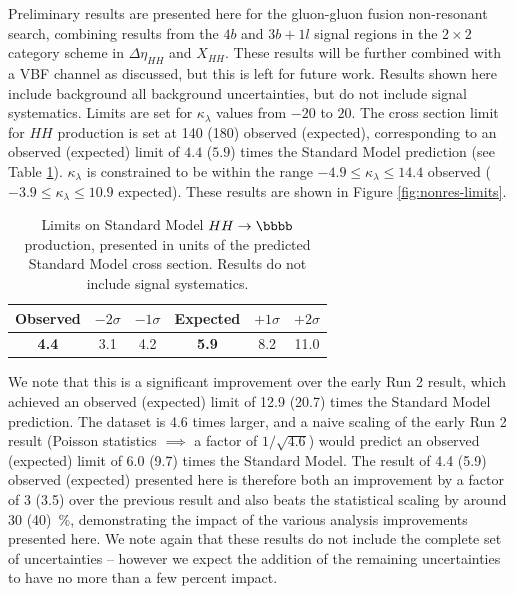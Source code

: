 Preliminary results are presented here for the gluon-gluon fusion non-resonant search, combining results from the $4b$ 
and $3b+1l$ signal regions in the $2\times 2$ category scheme in $\Delta \eta_{HH}$ and $X_{HH}$. These results will be 
further combined with a VBF channel as discussed, but this is left for future work. Results shown here include 
background all background uncertainties, but do not include signal systematics. Limits are set for $\kappa_{\lambda}$ 
values from $-20$ to $20$. 
The cross section limit for $HH$ production is set at \SI{140}{\fb} (\SI{180}{\fb}) observed (expected), 
corresponding to an observed (expected) limit of $4.4$ ($5.9$) times the Standard Model prediction 
(see Table \ref{tbl:SM-HH-limits}). 
$\kappa_{\lambda}$ is constrained to be within the range $-4.9 \leq \kappa_{\lambda} \leq 14.4$ observed 
($-3.9 \leq \kappa_{\lambda} \leq 10.9$ expected). These results are shown in Figure \ref{fig:nonres-limits}.

\begin{table}
\centering
\begin{tabular}{ |c|c|c|c|c|c| } 
\hline
\textbf{Observed} & $-2\sigma$ & $-1\sigma$ & \textbf{Expected} & $+1\sigma$ & $+2\sigma$\\
 \hline
\textbf{4.4}	& 3.1	& 4.2 & \textbf{5.9}	& 8.2 & 11.0\\
 \hline
\end{tabular}
 \caption{\label{tbl:SM-HH-limits} Limits on Standard Model $HH\rightarrow \bbbb$ production, presented in units of the 
predicted Standard Model cross section. Results do not include signal systematics.}
\end{table}

We note that this is a significant improvement over the early Run 2 result, which achieved an observed (expected) 
limit of 12.9 (20.7) times the Standard Model prediction. The dataset is 4.6 times larger, and a naive scaling 
of the early Run 2 result (Poisson statistics $\implies$ a factor of $1/\sqrt{4.6}$) would predict an observed (expected)
limit of 6.0 (9.7) times the Standard Model. The result of 4.4 (5.9) observed (expected) presented here is 
therefore both an improvement by a factor of 3 (3.5) over the previous result and also beats the statistical 
scaling by around 30 (40)~\%, demonstrating the impact of the various analysis improvements presented here. We 
note again that these results do not include the complete set of uncertainties -- however we expect the addition 
of the remaining uncertainties to have no more than a few percent impact.


